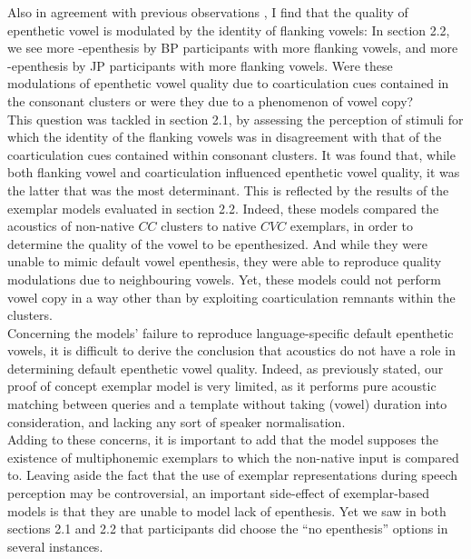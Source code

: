 Also in agreement with previous observations \cite{dupoux2011}, I find that the quality of epenthetic vowel is modulated by the identity of flanking vowels: In {\color{red}section 2.2}, we see more -epenthesis by BP participants with more  flanking vowels, and more -epenthesis by JP participants with more  flanking vowels. Were these modulations of epenthetic vowel quality due to coarticulation cues contained in the consonant clusters or were they due to a phenomenon of vowel copy? \\

This question was tackled in {\color{red}section 2.1}, by assessing the perception of stimuli for which the identity of the flanking vowels was in disagreement with that of the coarticulation cues contained within consonant clusters. It was found that, while both flanking vowel and coarticulation influenced epenthetic vowel quality, it was the latter that was the most determinant. This is reflected by the results of the exemplar models evaluated in {\color{red}section 2.2}. Indeed, these models compared the acoustics of non-native $CC$ clusters to native $CVC$ exemplars, in order to determine the quality of the vowel to be epenthesized. And while they were unable to mimic default vowel epenthesis, they were able to reproduce quality modulations due to neighbouring vowels. Yet, these models could not perform vowel copy in a way other than by exploiting coarticulation remnants within the clusters. \\             

Concerning the models' failure to reproduce language-specific default epenthetic vowels, it is difficult to derive the conclusion that acoustics do not have a role in determining default epenthetic vowel quality. Indeed, as previously stated, our proof of concept exemplar model is very limited, as it performs pure acoustic matching between queries and a template without taking (vowel) duration into consideration, and lacking any sort of speaker normalisation. \\

Adding to these concerns, it is important to add that the model supposes the existence of {\color{red}multiphonemic} exemplars to which the non-native input is compared to. Leaving aside the fact that the use of exemplar representations during speech perception may be controversial, an important side-effect of exemplar-based models is that they are unable to model lack of epenthesis. Yet we saw in both {\color{red}sections 2.1 and 2.2} that participants did choose the ``no epenthesis'' options {\color{red}in several instances}.  \\

